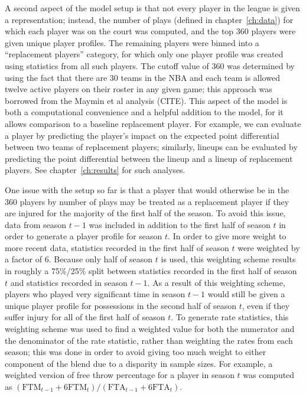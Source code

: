 A second aspect of the model setup is that not every player in the league is given a
representation; instead, the number of plays (defined in chapter~\ref{ch:data}) for
which each player was on the court was computed, and the top 360 players were given
unique player profiles. The remaining players were binned into a ``replacement
players'' category, for which only one player profile was created using statistics
from all such players. The cutoff value of 360 was determined by using the fact that
there are 30 teams in the NBA and each team is allowed twelve active players on
their roster in any given game; this approach was borrowed from the Maymin et al
analysis (CITE). This aspect of the model is both a computational convenience and a
helpful addition to the model, for it allows comparison to a baseline replacement
player. For example, we can evaluate a player by predicting the player's impact on
the expected point differential between two teams of replacement players; similarly,
lineups can be evaluated by predicting the point differential between the lineup and
a lineup of replacement players. See chapter~\ref{ch:results} for such analyses.

One issue with the setup so far is that a player that would otherwise be in the 360
players by number of plays may be treated as a replacement player if they are
injured for the majority of the first half of the season. To avoid this issue, data
from season $t-1$ was included in addition to the first half of season $t$ in order
to generate a player profile for season $t$. In order to give more weight to more
recent data, statistics recorded in the first half of season $t$ were weighted by a
factor of 6. Because only half of season $t$ is used, this weighting scheme results
in roughly a 75\%/25\% split between statistics recorded in the first half of season
$t$ and statistics recorded in season $t-1$. As a result of this weighting scheme,
players who played very significant time in season $t-1$ would still be given a
unique player profile for possessions in the second half of season $t$, even if they
suffer injury for all of the first half of season $t$. To generate rate statistics,
this weighting scheme was used to find a weighted value for both the numerator and
the denominator of the rate statistic, rather than weighting the rates from each
season; this was done in order to avoid giving too much weight to either component
of the blend due to a disparity in sample sizes. For example, a weighted version of
free throw percentage for a player in season $t$ was computed as $(\text{FTM}_{t-1}
+ 6\text{FTM}_t)/(\text{FTA}_{t-1} + 6\text{FTA}_t)$.

